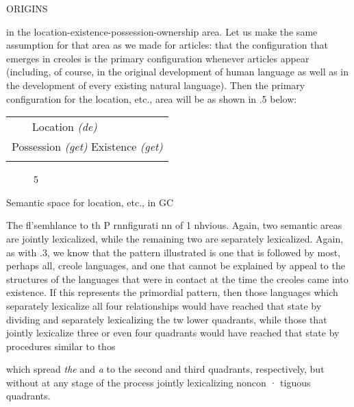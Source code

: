  


ORIGINS

in the location-existence-possession-ownership area. Let us make the same assumption for that area as we made for articles: that the con\-figuration that emerges in creoles is the primary configuration whenever articles appear (including, of course, in the original development of human language as well as in the development of every existing natural language). Then the primary configuration for the location, etc., area will be as shown in .5 below:

\begin{tabular}{ll}
\lsptoprule

\multicolumn{1}{l}{Ownership \textit{(a)}} & Location \textit{(}\textit{de)}\\
\multicolumn{2}{l}{Possession \textit{(get) }Existence \textit{(get)}}\\
\lspbottomrule
\end{tabular}
\begin{figure}
\caption{5}
\label{fig:4}
\end{figure}

Semantic space for location, etc., in GC

The fl'semhlance to th P rnnfigurati nn of  1 nhvious. Again, two semantic areas are jointly lexicalized, while the remaining two are separately lexicalized. Again, as with .3, we know that the pattern illustrated is one that is followed by most, perhaps all, creole languages, and one that cannot be explained by appeal to the structures of the languages that were in contact at the time the creoles came into existence. If this represents the primordial pattern, then those languages which separately lexicalize all four relationships would have reached that state by dividing and separately lexicalizing the tw lower quadrants, while those that jointly lexicalize three or even four quadrants would have reached that state by procedures similar to thos

which spread \textit{the} and \textit{a} to the second and third quadrants, respectively, but without at any stage of the process jointly lexicalizing noncon · tiguous quadrants.

